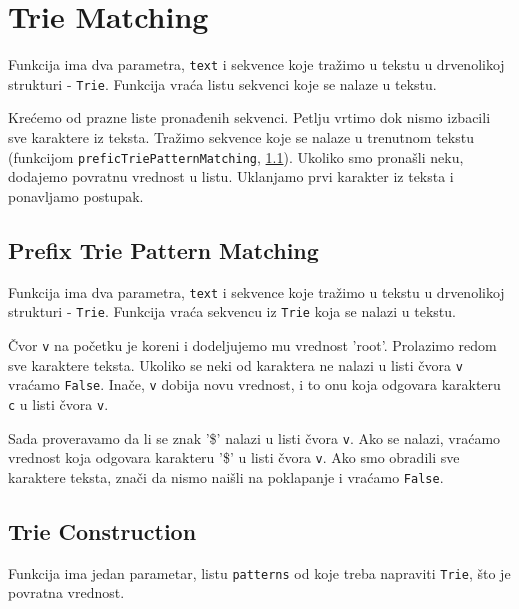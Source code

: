 \section{Trie Matching}

Funkcija ima dva parametra, \texttt{text} i sekvence koje tražimo u tekstu u drvenolikoj strukturi - \texttt{Trie}. Funkcija vraća listu sekvenci koje se nalaze u tekstu.

Krećemo od prazne liste pronađenih sekvenci. Petlju vrtimo dok nismo izbacili sve karaktere iz teksta. Tražimo sekvence koje se nalaze u trenutnom tekstu (funkcijom \texttt{preficTriePatternMatching}, \ref{prefixTrieMatching}). Ukoliko smo pronašli neku, dodajemo povratnu vrednost u listu. Uklanjamo prvi karakter iz teksta i ponavljamo postupak.




\subsection{Prefix Trie Pattern Matching}
\label{prefixTrieMatching}

Funkcija ima dva parametra, \texttt{text} i sekvence koje tražimo u tekstu u drvenolikoj strukturi - \texttt{Trie}. Funkcija vraća sekvencu iz \texttt{Trie} koja se nalazi u tekstu.

Čvor \texttt{v} na početku je koreni i dodeljujemo mu vrednost 'root'. Prolazimo redom sve karaktere teksta. Ukoliko se neki od karaktera ne nalazi u listi čvora \texttt{v} vraćamo \texttt{False}. Inače, \texttt{v} dobija novu vrednost, i to onu koja odgovara karakteru \texttt{c} u listi čvora \texttt{v}. 

Sada proveravamo da li se znak '\$' nalazi u listi čvora \texttt{v}. Ako se nalazi, vraćamo vrednost koja odgovara karakteru '\$' u listi čvora \texttt{v}. Ako smo obradili sve karaktere teksta, znači da nismo naišli na poklapanje i vraćamo \texttt{False}.




\subsection{Trie Construction}
\label{trieConstruction}

Funkcija ima jedan parametar, listu \texttt{patterns} od koje treba napraviti \texttt{Trie}, što je povratna vrednost.

